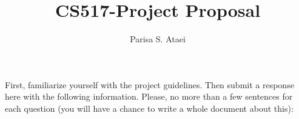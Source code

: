 \documentclass[sigconf]{acmart}
\title{CS517-Project Proposal}
\author{Parisa S. Ataei}
\begin{document}
\maketitle

\begin{comment}
Looks solid, and I'm confident that you know what you're doing. However please try to help the reader understand what's going on (I don't understand syntax-driven induction, variational point). Often questions of minimality are in Sigma2 (there exists a smaller program such that for all inputs, the two give the same output). So this problem might be too hard. It depends on the size of the program's domain.
\end{comment}

First, familiarize yourself with the project guidelines. Then submit a response here with the following information. Please, no more than a few sentences for each question (you will have a chance to write a whole document about this):
\end{document}
